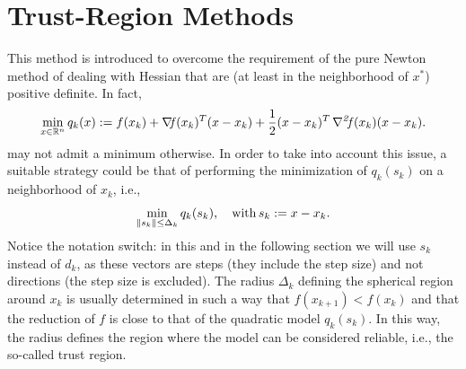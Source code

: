\documentclass[10pt,a4paper]{article}
\begin{document}
\section{Trust-Region Methods}
This method is introduced to overcome the requirement of the pure Newton method of dealing with Hessian that are (at least in the neighborhood of $x^*$) positive definite. In fact,
\begin{equation*}
	\min_{x \in \mathbb{R}^n} q_k(x):= f(x_k) + \operatorname*{\mathit{\nabla \!f}}(x_k)^T (x - x_k) + \frac{1}{2}(x - x_k)^T \operatorname*{\mathit{\nabla^2 \!f}}(x_k)(x - x_k).
\end{equation*}
may not admit a minimum otherwise. In order to take into account this issue, a suitable strategy could be that of performing the minimization of $q_k(s_k)$ on a neighborhood of $x_k$, i.e., 
\begin{equation}\label{eq:trust-region}
	\min_{\|s_k\| \leq \Delta_k} q_k(s_k), \quad \mathord{\mathrm{with }}\, s_k:=x-x_k.
\end{equation}
Notice the notation switch: in this and in the following section we will use $s_k$ instead of $d_k$, as these vectors are steps (they include the step size) and not directions (the step size is excluded). The radius $\Delta_k$ defining the spherical region around $x_k$ is usually determined in such a way that $f(x_{k+1})<f(x_k)$ and that the reduction of $f$ is close to that of the
quadratic model $q_k(s_k)$. In this way, the radius defines the region where the model can be considered reliable, i.e., the so-called trust region. 
\end{document}
